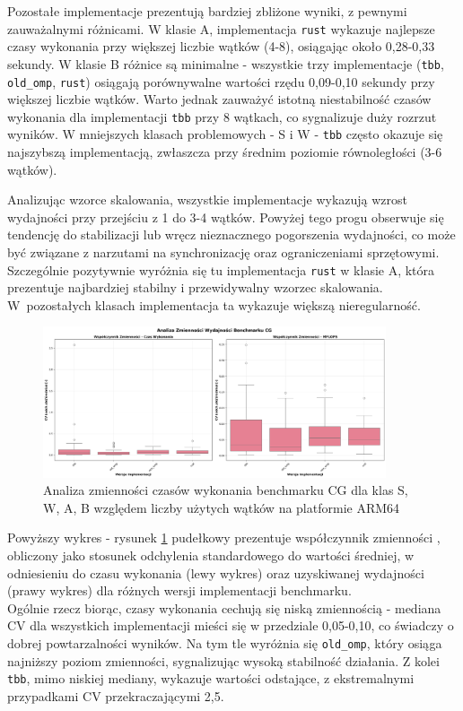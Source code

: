 Pozostałe implementacje prezentują bardziej zbliżone wyniki, z pewnymi zauważalnymi różnicami. W klasie A, implementacja \texttt{rust} wykazuje najlepsze czasy wykonania przy większej liczbie wątków (4-8), osiągając około 0,28-0,33 sekundy. W klasie B różnice są minimalne - wszystkie trzy implementacje (\texttt{tbb}, \texttt{old\_omp}, \texttt{rust}) osiągają porównywalne wartości rzędu 0,09-0,10 sekundy przy większej liczbie wątków. Warto jednak zauważyć istotną niestabilność czasów wykonania dla implementacji \texttt{tbb} przy 8 wątkach, co sygnalizuje duży rozrzut wyników. W mniejszych klasach problemowych - S i W - \texttt{tbb} często okazuje się najszybszą implementacją, zwłaszcza przy średnim poziomie równoległości (3-6 wątków).

Analizując wzorce skalowania, wszystkie implementacje wykazują wzrost wydajności przy przejściu z 1 do 3-4 wątków. Powyżej tego progu obserwuje się tendencję do stabilizacji lub wręcz nieznacznego pogorszenia wydajności, co może być związane z narzutami na synchronizację oraz ograniczeniami sprzętowymi. Szczególnie pozytywnie wyróżnia się tu implementacja \texttt{rust} w klasie A, która prezentuje najbardziej stabilny i przewidywalny wzorzec skalowania. W~pozostałych klasach implementacja ta wykazuje większą nieregularność.

\begin{figure}[H]
    \centering
    \includegraphics[width=0.9\textwidth]{analiza/images/parallel/cg/arm/cg_analiza_zmiennosci.png}
    \caption{Analiza zmienności czasów wykonania benchmarku CG dla klas S, W, A, B względem liczby użytych wątków na platformie ARM64}
    \label{cg_analiza_zmiennosci}
\end{figure}
Powyższy wykres - rysunek \ref{cg_analiza_zmiennosci} pudełkowy prezentuje współczynnik zmienności \mbox{}, obliczony jako stosunek odchylenia standardowego do wartości średniej, w odniesieniu do czasu wykonania (lewy wykres) oraz uzyskiwanej wydajności (prawy wykres) dla różnych wersji implementacji benchmarku.\\
Ogólnie rzecz biorąc, czasy wykonania cechują się niską zmiennością - mediana CV dla wszystkich implementacji mieści się w przedziale 0,05-0,10, co świadczy o dobrej powtarzalności wyników. Na tym tle wyróżnia się \texttt{old\_omp}, który osiąga najniższy poziom zmienności, sygnalizując wysoką stabilność działania. Z kolei \texttt{tbb}, mimo niskiej mediany, wykazuje wartości odstające, z ekstremalnymi przypadkami CV przekraczającymi 2,5.

